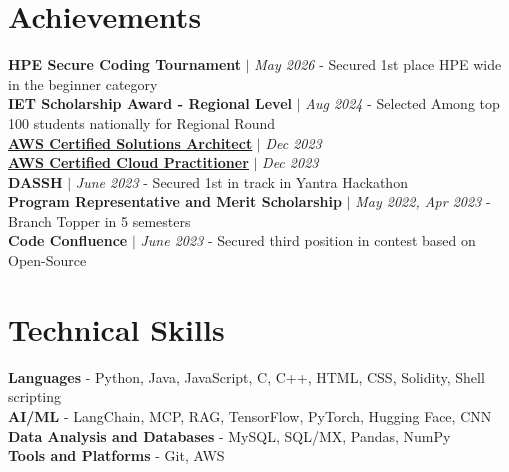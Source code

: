 \documentclass[letterpaper,10pt]{article} %
\begin{document}
\section{Achievements}
 \begin{itemize}[leftmargin=0.15in, label={}]
    \small{\item{
    {\textbf{HPE Secure Coding Tournament} $|$ \emph{May 2026}}{ - Secured 1st place HPE wide in the beginner category }\\
    
    {\textbf{IET Scholarship Award - Regional Level } $|$ \emph{Aug 2024}}{ - Selected Among top 100 students nationally for Regional Round }\\
    
    {\textbf{\href{https://www.credly.com/badges/fc07f2c2-67e5-4c73-bec7-d7e336bd6d01/linked_in?t=s5ssa2}
    {\underline{AWS Certified Solutions Architect}}}  $|$ \emph{Dec 2023}} \\
    
    {\textbf{\href{https://www.credly.com/badges/e9135848-b13f-4cb5-ad22-90c765fbde43/linked_in_profile}
    {\underline{AWS Certified Cloud Practitioner}}} $|$ \emph{Dec 2023}} \\
    
    {\textbf{DASSH} $|$ \emph{June 2023}}{ - Secured 1st in track in Yantra Hackathon} \\
    
     {\textbf{Program Representative and Merit Scholarship} $|$ \emph{May 2022, Apr 2023}}{ - Branch Topper in 5 semesters} \\
     
     {\textbf{Code Confluence} $|$ \emph{June 2023}}{ - Secured third position in contest based on Open-Source} \\
        }}
    \end{itemize}
\section{Technical Skills}
 \begin{itemize}[leftmargin=0.15in, label={}]
    \small{\item{
     \textbf{Languages}{ - Python, Java, JavaScript, C, C++, HTML, CSS, Solidity, Shell scripting} \\
     \textbf{AI/ML} - {LangChain, MCP, RAG, TensorFlow, PyTorch, Hugging Face, CNN} \\
     \textbf{Data Analysis and Databases}{ - MySQL, SQL/MX, Pandas, NumPy} \\
     \textbf{Tools and Platforms}{ - Git, AWS} \\
    }
    }
 \end{itemize}
\end{document}
